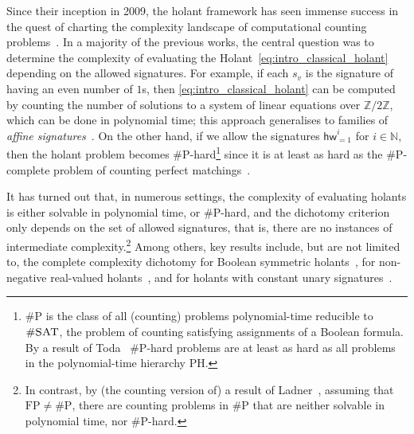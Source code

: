 \documentclass[authorcolumns,numberwithinsect]{no-lipics-v2022}
\begin{document}
Since their inception in 2009, the holant framework has seen immense success in the quest of charting the complexity landscape of computational counting problems~\cite{CaiL11,CaiLX14,CaiGW16,LinW17,Backens18}. In a majority of the previous works, the central question was to determine the complexity of evaluating the Holant~\eqref{eq:intro_classical_holant} depending on the allowed signatures. For example, if each $s_v$ is the signature of having an even number of $1$s, then \eqref{eq:intro_classical_holant} can be computed by counting the number of solutions to a system of linear equations over $\mathbb{Z}/2\mathbb{Z}$, which can be done in polynomial time; this approach generalises to families of \emph{affine signatures}~\cite{ParityHolant13}. On the other hand, if we allow the signatures $\mathsf{hw}^i_{=1}$ for $i\in \mathbb{N}$, then the holant problem becomes $\#\mathrm{P}$-hard\footnote{$\#\mathrm{P}$ is the class of all (counting) problems polynomial-time reducible to $\#\textsc{SAT}$, the problem of counting satisfying assignments of a Boolean formula. By a result of Toda~\cite{Toda91} $\#\mathrm{P}$-hard problems are at least as hard as all problems in the polynomial-time hierarchy $\mathrm{PH}$.} since it is at least as hard as the $\#\mathrm{P}$-complete problem of counting perfect matchings~\cite{Valiant79,Valiant79b}.

It has turned out that, in numerous settings, the complexity of evaluating holants is either solvable in polynomial time, or $\#\mathrm{P}$-hard, and the dichotomy criterion only depends on the set of allowed signatures, that is, there are no instances of intermediate complexity.\footnote{In contrast, by (the counting version of) a result of Ladner~\cite{Ladner75}, assuming that $\mathrm{FP}\neq \#\mathrm{P}$, there are counting problems in $\#\mathrm{P}$ that are neither solvable in polynomial time, nor $\#\mathrm{P}$-hard.} Among others, key results include, but are not limited to, the complete complexity dichotomy for Boolean symmetric holants~\cite{CaiGW16}, for non-negative real-valued holants~\cite{LinW17}, and for holants with constant unary signatures~\cite{Backens18}.
\end{document}
